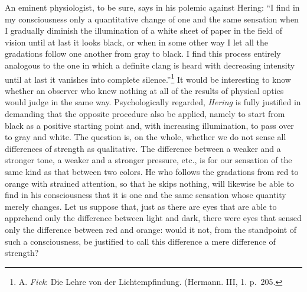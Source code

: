 \documentclass[12pt,a4paper]{book}
\newcommand{\opage}[1]{\marginnote{\footnotesize\textit{[#1]}}}
\begin{document}
An eminent physiologist, to be sure, says in his polemic against Hering:
``I find in my consciousness only a quantitative change of one and the
same sensation when I gradually diminish the illumination of a white
sheet of paper in the field of vision until at last it looks black, or
when in some other way I let all the gradations follow one another from
gray to black. I find this process entirely analogous to the one in
which a definite clang is heard with decreasing intensity until at last
it vanishes into complete silence.''\footnote{A. \emph{Fick}: Die Lehre
von der Lichtempfindung. (Hermann. III, 1. p.~205.} It would be
interesting to know whether an observer who knew nothing at all of the
results of physical optics would judge in the same way. Psychologically
regarded, \emph{Hering} is fully justified in demanding that the opposite
procedure also be applied, namely to start from black as a positive
starting point and, with increasing illumination, to pass over to gray
and white. The question is, on the whole, whether we do not sense all
differences of strength as qualitative. The difference between a weaker
and a stronger tone, a weaker and a stronger pressure, etc., is for our
sensation of the same
\opage{136}kind as that between two colors. He who follows the
gradations from red to orange with strained attention, so that he skips
nothing, will likewise be able to find in his consciousness that it is
one and the same sensation whose quantity merely changes. Let us suppose
that, just as there are eyes that are able to apprehend only the
difference between light and dark, there were eyes that sensed only the
difference between red and orange: would it not, from the standpoint of
such a consciousness, be justified to call this difference a mere
difference of strength?
\end{document}

